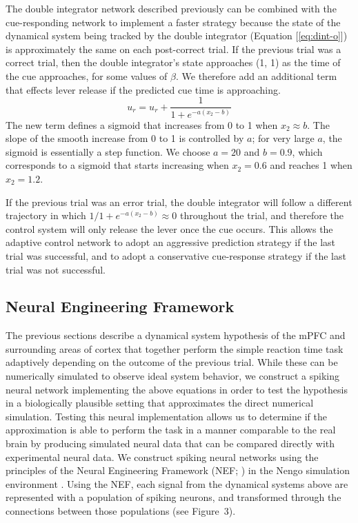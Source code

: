 \documentclass[11pt]{article}
\begin{document}
The double integrator network described
previously can be combined with the
cue-responding network to implement
a faster strategy because
the state of the dynamical system being tracked by
the double integrator (Equation [\ref{eq:dint-o}])
is approximately the same on each post-correct trial.
If the previous trial was a correct trial,
then the double integrator's state
approaches (1, 1) as the time of the cue approaches,
for some values of $\beta$.
We therefore add an additional term
that effects lever release
if the predicted cue time is approaching.
\begin{equation} \label{eq:release}
  u_r = u_r + \frac{1}{1 + e^{-a (x_2 - b)}}
\end{equation}
The new term defines a sigmoid that increases
from 0 to 1 when $x_2 \approx b$.
The slope of the smooth increase
from 0 to 1 is controlled by $a$;
for very large $a$, the sigmoid
is essentially a step function.
We choose $a = 20$ and $b = 0.9$,
which corresponds to a sigmoid
that starts increasing
when $x_2 = 0.6$ and reaches 1 when $x_2 = 1.2$.

If the previous trial was an error trial,
the double integrator
will follow a different trajectory
in which $1 / 1 + e^{-a (x_2 - b)} \approx 0$
throughout the trial,
and therefore the control system
will only release the lever
once the cue occurs.
This allows the adaptive control network
to adopt an aggressive prediction strategy
if the last trial was successful,
and to adopt a conservative cue-response strategy
if the last trial was not successful.


\subsection{Neural Engineering Framework} \label{sec:nef}

The previous sections describe
a dynamical system hypothesis
of the mPFC and surrounding areas
of cortex that together
perform the simple reaction time task
adaptively depending on the outcome
of the previous trial.
While these can be numerically simulated
to observe ideal system behavior,
we construct a spiking neural network
implementing the above equations
in order to test the hypothesis
in a biologically plausible setting
that approximates the direct numerical simulation.
Testing this neural implementation
allows us to determine if the approximation
is able to perform the task
in a manner comparable to the real brain
by producing simulated neural data
that can be compared directly with
experimental neural data.
We construct spiking neural networks
using the principles of the Neural Engineering Framework
(NEF; )
in the Nengo simulation environment
\cite{BekolayInpress}.
Using the NEF, each signal
from the dynamical systems above
are represented with a population of spiking neurons,
and transformed through the connections
between those populations
(see Figure~3).
\end{document}
